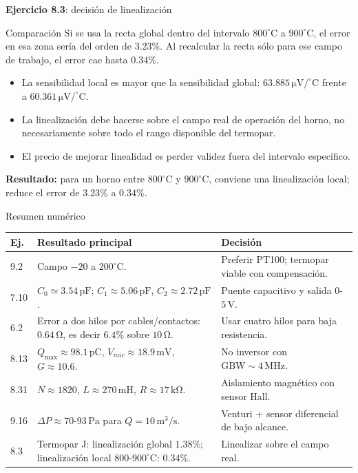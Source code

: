 \documentclass[aspectratio=169,9pt]{beamer}
\newcommand{\exercise}[1]{\textbf{Ejercicio #1}}
\newcommand{\result}[1]{\textbf{\color{eiTeal}Resultado:} #1}
\newcommand{\unit}[1]{\,\mathrm{#1}}
\newcommand{\GBW}{\mathrm{GBW}}
\begin{document}
\begin{frame}{\exercise{8.3}: decisión de linealización}
  \begin{block}{Comparación}
    Si se usa la recta global dentro del intervalo \(800^\circ\mathrm{C}\) a \(900^\circ\mathrm{C}\), el error en esa zona sería del orden de \(3.23\%\). Al recalcular la recta sólo para ese campo de trabajo, el error cae hasta \(0.34\%\).
  \end{block}

  \begin{itemize}
    \item La sensibilidad local es mayor que la sensibilidad global: \(63.885\unit{\mu V/^\circ C}\) frente a \(60.361\unit{\mu V/^\circ C}\).
    \item La linealización debe hacerse sobre el campo real de operación del horno, no necesariamente sobre todo el rango disponible del termopar.
    \item El precio de mejorar linealidad es perder validez fuera del intervalo específico.
  \end{itemize}

  \result{para un horno entre \(800^\circ\mathrm{C}\) y \(900^\circ\mathrm{C}\), conviene una linealización local; reduce el error de \(3.23\%\) a \(0.34\%\).}
\end{frame}

\begin{frame}{Resumen numérico}
  \small
  \begin{tabularx}{\textwidth}{@{}lXl@{}}
    \toprule
    \textbf{Ej.} & \textbf{Resultado principal} & \textbf{Decisión}\\
    \midrule
    9.2 & Campo \(-20\) a \(200^\circ\mathrm{C}\). & Preferir PT100; termopar viable con compensación.\\
    7.10 & \(C_0\simeq3.54\unit{pF}\); \(C_1\approx5.06\unit{pF}\), \(C_2\approx2.72\unit{pF}\). & Puente capacitivo y salida \(0\)-\(5\unit{V}\).\\
    6.2 & Error a dos hilos por cables/contactos: \(0.64\unit{\Omega}\), es decir \(6.4\%\) sobre \(10\unit{\Omega}\). & Usar cuatro hilos para baja resistencia.\\
    8.13 & \(Q_{\max}\approx98.1\unit{pC}\), \(V_{mic}\approx18.9\unit{mV}\), \(G\approx10.6\). & No inversor con \(\GBW\sim4\unit{MHz}\).\\
    8.31 & \(N\approx1820\), \(L\approx270\unit{mH}\), \(R\approx17\unit{k\Omega}\). & Aislamiento magnético con sensor Hall.\\
    9.16 & \(\Delta P\approx70\)-\(93\unit{Pa}\) para \(Q=10\unit{m^3/s}\). & Venturi + sensor diferencial de bajo alcance.\\
    8.3 & Termopar J: linealización global \(1.38\%\); linealización local \(800\)-\(900^\circ\mathrm{C}\): \(0.34\%\). & Linealizar sobre el campo real.\\
    \bottomrule
  \end{tabularx}
\end{frame}
\end{document}
